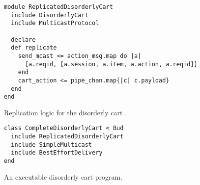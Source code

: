 \begin{figure}[h]
\begin{scriptsize}
\begin{lstlisting}
module ReplicatedDisorderlyCart
  include DisorderlyCart
  include MulticastProtocol

  declare
  def replicate
    send_mcast <= action_msg.map do |a| 
      [a.reqid, [a.session, a.item, a.action, a.reqid]] 
    end
    cart_action <= pipe_chan.map{|c| c.payload}
  end
end
\end{lstlisting}
\centering
\vspace{-10pt}
\caption{Replication logic for the disorderly cart .}
\label{fig:disorderly-repl}
\end{scriptsize}
\vspace{-2pt}
\end{figure}


\begin{figure}[h]
\begin{scriptsize}
\begin{lstlisting}
class CompleteDisorderlyCart < Bud
  include ReplicatedDisorderlyCart
  include SimpleMulticast
  include BestEffortDelivery
end
\end{lstlisting}
\centering
\vspace{-10pt}
\caption{An executable disorderly cart program.}
\label{fig:disorderly-complete}
\end{scriptsize}
\vspace{-2pt}
\end{figure}